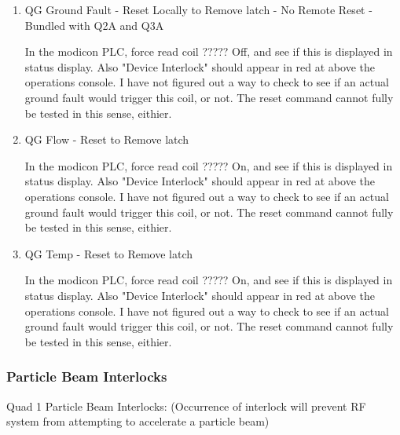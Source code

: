 \documentclass[11pt]{book}		%
\begin{document}
\begin{enumerate}
 \item QG Ground Fault - Reset Locally to Remove latch - No Remote Reset - Bundled with Q2A and Q3A

\color{red}
In the modicon PLC, force read coil ????? Off, and see if this is displayed in status display. Also "Device Interlock" should appear in red at above the operations console. I have not figured out a way to check to see if an actual ground fault would trigger this coil, or not. The reset command cannot fully be tested in this sense, eithier.
\color{black}

 \item QG Flow - Reset to Remove latch

\color{red}
In the modicon PLC, force read coil ????? On, and see if this is displayed in status display. Also "Device Interlock" should appear in red at above the operations console. I have not figured out a way to check to see if an actual ground fault would trigger this coil, or not. The reset command cannot fully be tested in this sense, eithier.
\color{black}

 \item QG Temp - Reset to Remove latch

\color{red}
In the modicon PLC, force read coil ????? On, and see if this is displayed in status display. Also "Device Interlock" should appear in red at above the operations console. I have not figured out a way to check to see if an actual ground fault would trigger this coil, or not. The reset command cannot fully be tested in this sense, eithier.
\color{black}

\end{enumerate}

\subsubsection{Particle Beam Interlocks}\label{sect:cyc-equip-ctl-beamline-quad1-state-monitors-beam-interlocks}

Quad 1 Particle Beam Interlocks:
(Occurrence of interlock will prevent RF system from attempting to accelerate a particle beam)
\end{document}
